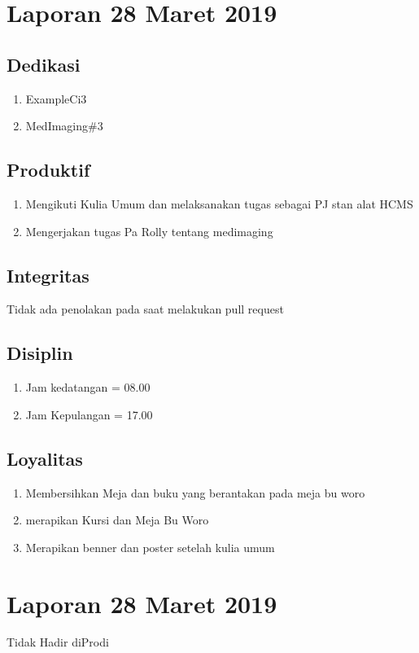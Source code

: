 \section{Laporan 28 Maret 2019}
\subsection{Dedikasi}
\begin{enumerate}
\item ExampleCi3
\item MedImaging\#3
\end{enumerate}
\subsection{Produktif}
\begin{enumerate}
\item Mengikuti Kulia Umum dan melaksanakan tugas sebagai PJ stan alat HCMS
\item Mengerjakan tugas Pa Rolly tentang medimaging
\end{enumerate}
\subsection{Integritas}
Tidak ada penolakan pada saat melakukan pull request
\subsection{Disiplin}
\begin{enumerate}
\item Jam kedatangan =  08.00
\item Jam Kepulangan = 17.00
\end{enumerate}
\subsection{Loyalitas}
\begin{enumerate}
\item Membersihkan Meja dan buku yang berantakan pada meja bu woro
\item merapikan Kursi dan Meja Bu Woro
\item Merapikan benner dan poster setelah kulia umum
\end{enumerate}

\section{Laporan 28 Maret 2019}
Tidak Hadir diProdi


